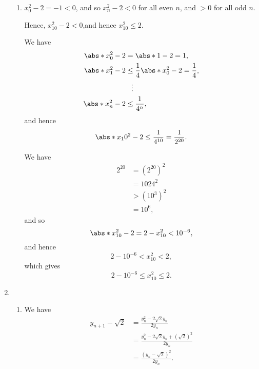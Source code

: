 \begin{enumerate}
\begin{enumerate}
              \item \(x_0^2 - 2 = -1 < 0\), and so \(x_n^2 - 2 < 0\) for all even \(n\), and \(> 0\) for all odd \(n\).

                    Hence, \(x_{10}^2 - 2 < 0\),and hence \(x_{10}^2 \leq 2\).

                    We have
                    \begin{align*}
                        \abs*{x_0^2 - 2} & = \abs*{1 - 2} = 1,                              \\
                        \abs*{x_1^2 - 2} & \leq \frac{1}{4} \abs*{x_0^2 - 2} = \frac{1}{4}, \\
                                         & \phantom{\leq}\vdots                             \\
                        \abs*{x_n^2 - 2} & \leq \frac{1}{4^n},
                    \end{align*}
                    and hence
                    \[
                        \abs*{x_10^2 - 2} \leq \frac{1}{4^{10}} = \frac{1}{2^{20}}.
                    \]

                    We have
                    \begin{align*}
                        2^{20} & = \left(2^{20}\right)^2 \\
                               & = 1024^2                \\
                               & > \left(10^3\right)^2   \\
                               & = 10^6,
                    \end{align*}
                    and so
                    \[
                        \abs*{x_{10}^2 - 2} = 2 - x_{10}^2 < 10^{-6},
                    \]
                    and hence
                    \[
                        2 - 10^{-6} < x_{10}^2 < 2,
                    \]
                    which gives
                    \[
                        2 - 10^{-6} \leq x_{10}^2 \leq 2.
                    \]
          \end{enumerate}

    \item \begin{enumerate}
              \item We have
                    \begin{align*}
                        y_{n + 1} - \sqrt{2} & = \frac{y_n^2 - 2\sqrt{2} y_n}{2 y_n}                            \\
                                             & = \frac{y_n^2 - 2 \sqrt{2} y_n + \left(\sqrt{2}\right)^2}{2 y_n} \\
                                             & = \frac{\left(y_n - \sqrt{2}\right)^2}{2 y_n}.
                    \end{align*}


\end{enumerate}
\end{enumerate}
